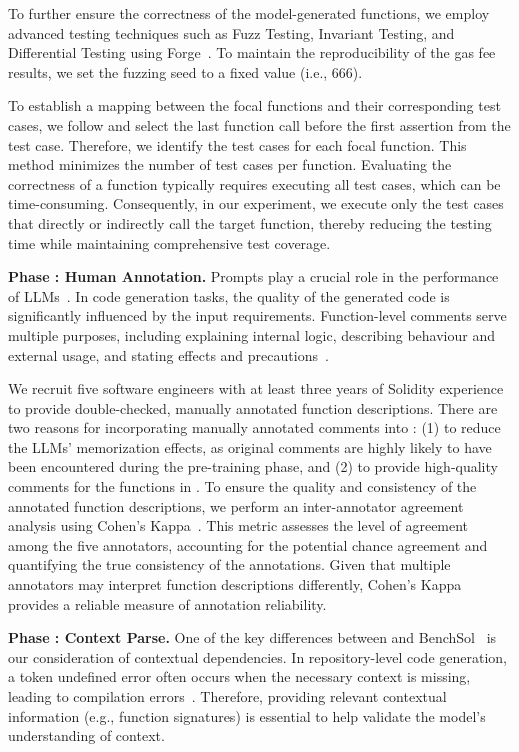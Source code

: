 To further ensure the correctness of the model-generated functions, we employ advanced testing techniques such as Fuzz Testing, Invariant Testing, and Differential Testing using Forge~\cite{Foundry_Invariant_Test}. 
To maintain the reproducibility of the gas fee results, we set the fuzzing seed to a fixed value (i.e., 666).


To establish a mapping between the focal functions and their corresponding test cases, we follow \citet{nie2023learning} and select the last function call before the first assertion from the test case.
Therefore, we identify the test cases for each focal function. 
This method minimizes the number of test cases per function. 
Evaluating the correctness of a function typically requires executing all test cases, which can be time-consuming. 
Consequently, in our experiment, we execute only the test cases that directly or indirectly call the target function, thereby reducing the testing time while maintaining comprehensive test coverage.


\textbf{Phase : Human Annotation.}
Prompts play a crucial role in the performance of LLMs~\cite{jang2023can,sarkar2022like,shrivastava2023repository,zhou2022learning,zhou2022large}. 
In code generation tasks, the quality of the generated code is significantly influenced by the input requirements. 
Function-level comments serve multiple purposes, including explaining internal logic, describing behaviour and external usage, and stating effects and precautions~\cite{yu2024codereval}.


We recruit five software engineers with at least three years of Solidity experience to provide double-checked, manually annotated function descriptions. 
There are two reasons for incorporating manually annotated comments into \datasetname: (1) to reduce the LLMs' memorization effects, as original comments are highly likely to have been encountered during the pre-training phase, and (2) to provide high-quality comments for the functions in \datasetname. 
To ensure the quality and consistency of the annotated function descriptions, we perform an inter-annotator agreement analysis using Cohen's Kappa~\cite{mchugh2012interrater}. 
This metric assesses the level of agreement among the five annotators, accounting for the potential chance agreement and quantifying the true consistency of the annotations. 
Given that multiple annotators may interpret function descriptions differently, Cohen's Kappa provides a reliable measure of annotation reliability.


\textbf{Phase : Context Parse.}
One of the key differences between \mytitle and BenchSol~\cite{benchmark2024sol} is our consideration of contextual dependencies. 
In repository-level code generation, a token undefined error often occurs when the necessary context is missing, leading to compilation errors~\cite{A3CodGen}. 
Therefore, providing relevant contextual information (e.g., function signatures) is essential to help \mytitle validate the model's understanding of context.


